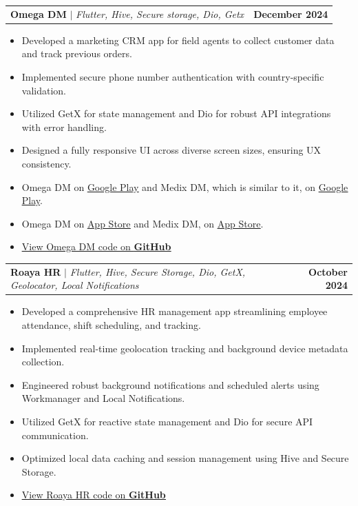\documentclass[letterpaper,11pt]{article}
\makeatletter
\newcommand{\resumeItem}[1]{
  \item\small{
    {#1 \vspace{-2pt}}
  }
}
\newcommand{\resumeProjectHeading}[2]{
    \item
    \begin{tabular*}{1.001\textwidth}{l@{\extracolsep{\fill}}r}
      \small#1 & \textbf{\small #2}\\
    \end{tabular*}\vspace{-7pt}
}
\newcommand{\resumeItemListStart}{\begin{itemize}}
\newcommand{\resumeItemListEnd}{\end{itemize}\vspace{-5pt}}
\makeatother
\begin{document}


    \resumeProjectHeading
      {\textbf{Omega DM} $|$ \emph{Flutter, Hive, Secure storage, Dio, Getx}}{December 2024}
      \resumeItemListStart
        \resumeItem{Developed a marketing CRM app for field agents to collect customer data and track previous orders.}
        \resumeItem{Implemented secure phone number authentication with country-specific validation.}
        \resumeItem{Utilized GetX for state management and Dio for robust API integrations with error handling.}
        \resumeItem{Designed a fully responsive UI across diverse screen sizes, ensuring UX consistency.}
        \resumeItem{Omega DM on \underline{\href{https://play.google.com/store/apps/details?id=com.omega.omegadm}{Google Play}} and Medix DM, which is similar to it, on \underline{\href{https://play.google.com/store/apps/details?id=com.omegamedix.medixdm}{Google Play}}.}
        \resumeItem{Omega DM on \underline{\href{https://apps.apple.com/mr/app/omega-dm/id6738922350}{App Store}} and Medix DM, on \underline{\href{https://apps.apple.com/mr/app/medix-dm/id6739060928}{App Store}}.}
        \resumeItem{\href{https://github.com/elshoram974/dm}{\underline{View Omega DM code on \textbf{GitHub}}}}
      \resumeItemListEnd

\resumeProjectHeading
  {\textbf{Roaya HR} $|$ \emph{Flutter, Hive, Secure Storage, Dio, GetX, Geolocator, Local Notifications}}{October 2024}
  \resumeItemListStart
    \resumeItem{Developed a comprehensive HR management app streamlining employee attendance, shift scheduling, and tracking.}
    \resumeItem{Implemented real-time geolocation tracking and background device metadata collection.}
    \resumeItem{Engineered robust background notifications and scheduled alerts using Workmanager and Local Notifications.}
    \resumeItem{Utilized GetX for reactive state management and Dio for secure API communication.}
    \resumeItem{Optimized local data caching and session management using Hive and Secure Storage.}
    \resumeItem{\href{https://github.com/elshoram974/hr}{\underline{View Roaya HR code on \textbf{GitHub}}}}
  \resumeItemListEnd
\end{document}
